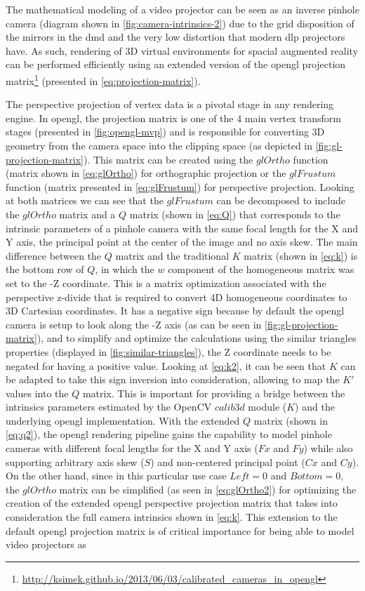 The mathematical modeling of a video projector can be seen as an inverse pinhole camera (diagram shown in \cref{fig:camera-intrinsics-2}) due to the grid disposition of the mirrors in the \gls{dmd} and the very low distortion that modern \gls{dlp} projectors have. As such, rendering of 3D virtual environments for spacial augmented reality can be performed efficiently using an extended version of the \gls{opengl} projection matrix\footnote{\url{http://ksimek.github.io/2013/06/03/calibrated\_cameras\_in\_opengl}} (presented in \cref{eq:projection-matrix}).

The perspective projection of vertex data is a pivotal stage in any rendering engine. In \gls{opengl}, the projection matrix is one of the 4 main vertex transform stages (presented in \cref{fig:opengl-mvp}) and is responsible for converting 3D geometry from the camera space into the clipping space (as depicted in \cref{fig:gl-projection-matrix}). This matrix can be created using the $glOrtho$ function (matrix shown in \cref{eq:glOrtho}) for orthographic projection or the $glFrustum$ function (matrix presented in \cref{eq:glFrustum}) for perspective projection. Looking at both matrices we can see that the $glFrustum$ can be decomposed to include the $glOrtho$ matrix and a $Q$ matrix (shown in \cref{eq:Q}) that corresponds to the intrinsic parameters of a pinhole camera with the same focal length for the X and Y axis, the principal point at the center of the image and no axis skew. The main difference between the $Q$ matrix and the traditional $K$ matrix \cite{Hartley2003} (shown in \cref{eq:k}) is the bottom row of $Q$, in which the $w$ component of the homogeneous matrix was set to the -Z coordinate. This is a matrix optimization associated with the perspective z-divide that is required to convert 4D homogeneous coordinates to 3D Cartesian coordinates. It has a negative sign because by default the \gls{opengl} camera is setup to look along the -Z axis (as can be seen in \cref{fig:gl-projection-matrix}), and to simplify and optimize the calculations using the similar triangles properties (displayed in \cref{fig:similar-triangles}), the Z coordinate needs to be negated for having a positive value. Looking at \cref{eq:k2}, it can be seen that $K$ can be adapted to take this sign inversion into consideration, allowing to map the $K'$ values into the $Q$ matrix. This is important for providing a bridge between the intrinsics parameters estimated by the OpenCV $calib3d$ module ($K$) and the underlying \gls{opengl} implementation. With the extended $Q$ matrix (shown in \cref{eq:q2}), the \gls{opengl} rendering pipeline gains the capability to model pinhole cameras with different focal lengths for the X and Y axis ($Fx$ and $Fy$) while also supporting arbitrary axis skew ($S$) and non-centered principal point ($Cx$ and $Cy$). On the other hand, since in this particular use case $Left=0$ and $Bottom=0$, the $glOrtho$ matrix can be simplified (as seen in \cref{eq:glOrtho2}) for optimizing the creation of the extended \gls{opengl} perspective projection matrix that takes into consideration the full camera intrinsics shown in \cref{eq:k}. This extension to the default \gls{opengl} projection matrix is of critical importance for being able to model video projectors as 